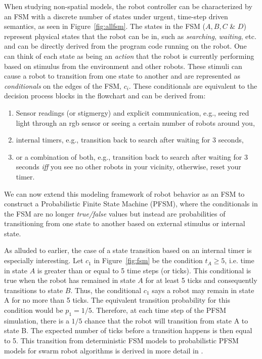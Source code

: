 \documentclass[Main.tex]{subfiles}
\begin{document}
When studying non-spatial models, the robot controller can be characterized by an FSM with a discrete number of states under urgent, time-step driven semantics, as seen in Figure~\ref{fig:allfsm}. The states in the FSM ($A, B, C$ \& $D$) represent physical states that the robot can be in, such as  \emph{searching}, \emph{waiting}, etc. and can be directly derived from the program code running on the robot. One can think of each state as being an \emph{action} that the robot is currently performing based on stimulus from the environment and other robots. These stimuli can cause a robot to transition from one state to another and are represented as \emph{conditionals} on the edges of the FSM, $c_i$. These conditionals are equivalent to the decision process blocks in the flowchart and can be derived from:
\begin{enumerate}
\item Sensor readings (or stigmergy) and explicit communication, e.g., seeing red light through an rgb sensor or seeing a certain number of robots around you,
\item internal timers, e.g., transition back to search after waiting for 3 seconds,
\item or a combination of both, e.g., transition back to search after waiting for 3 seconds \emph{iff} you see no other robots in your vicinity, otherwise, reset your timer.
\end{enumerate}

We can now extend this modeling framework of robot behavior as an FSM to construct a Probabilistic Finite State Machine (PFSM), where the conditionals in the FSM are no longer \emph{true/false} values but instead are probabilities of transitioning from one state to another based on external stimulus or internal state. 

As alluded to earlier, the case of a state transition based on an internal timer is especially interesting. Let $c_1$ in Figure~\ref{fig:fsm} be the condition $t_A \geq 5$, i.e. time in state $A$ is greater than or equal to 5 time steps (or ticks). This conditional is true when the robot has remained in state $A$ for at least 5 ticks and consequently transitions to state $B$. Thus, the conditional $c_1$ says a robot may remain in state A for no more than 5 ticks. The equivalent transition probability for this condition would be $p_1 = 1/5$. Therefore, at each time step of the PFSM simulation, there is a $1/5$ chance that the robot will transition from state A to state B. The expected number of ticks before a transition happens is then equal to 5. This transition from deterministic FSM models to probabilistic PFSM models for swarm robot algorithms is derived in more detail in \cite{correll2007coordination}.
 
\end{document}
